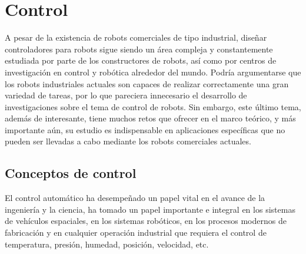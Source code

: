 

\chapter{\textcolor{Azul}{Control}}

A pesar de la existencia de robots comerciales de tipo industrial, diseñar controladores para robots sigue siendo un área compleja y constantemente estudiada por parte de los constructores de robots, así como por centros de investigación en control y robótica alrededor del mundo. Podría argumentarse que los robots industriales actuales son capaces de realizar correctamente una gran variedad de tareas, por lo que pareciera innecesario el desarrollo de investigaciones sobre el tema de control de robots. Sin embargo, este último tema, además de interesante, tiene muchos retos que ofrecer en el marco teórico, y más importante aún, su estudio es indispensable en aplicaciones específicas que no pueden ser llevadas a cabo mediante los robots comerciales actuales.\\


\section{Conceptos de control}
El control automático ha desempeñado un papel vital en el avance de la ingeniería y la ciencia, ha tomado un papel importante e integral en los sistemas de vehículos espaciales, en los sistemas robóticos, en los procesos modernos de fabricación y en cualquier operación industrial que requiera el control de temperatura, presión, humedad, posición, velocidad, etc.\\ 

